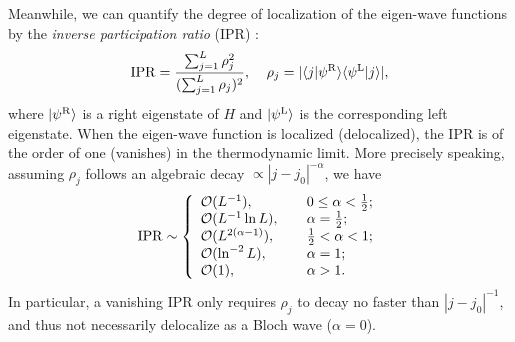 \documentclass{tADP2e}
\theoremstyle{plain}
\theoremstyle{plain}
\theoremstyle{definition}
\begin{document}
Meanwhile, we can quantify the degree of localization of the eigen-wave functions by the \emph{inverse participation ratio} (IPR) \cite{HN98}:
\begin{equation}
{\rm IPR}=\frac{\sum^L_{j=1} \rho_j^2}{(\sum^L_{j=1}\rho_j)^2},\;\;\;\;\rho_j=|\langle j|\psi^{\rm R}\rangle\langle\psi^{\rm L}| j\rangle|,
\end{equation} 
where $|\psi^{\rm R}\rangle$ is a right eigenstate of $H$ and $|\psi^{\rm L}\rangle$ is the corresponding left eigenstate. 
When the eigen-wave function is localized (delocalized), the IPR is of the order of one (vanishes) in the thermodynamic limit. More precisely speaking, assuming $\rho_j$ follows an algebraic decay $\propto|j-j_0|^{-\alpha}$, we have
\begin{equation}
{\rm IPR}\sim\left\{\begin{array}{ll} 
\mathcal{O}(L^{-1}), & \;\;\;\;0\le\alpha<\frac{1}{2}; \\  
\mathcal{O}(L^{-1}\ln L), & \;\;\;\;\alpha=\frac{1}{2}; \\ 
\mathcal{O}(L^{2(\alpha-1)}), & \;\;\;\;\frac{1}{2}<\alpha<1; \\ 
\mathcal{O}(\ln^{-2} L), & \;\;\;\;\alpha=1; \\ 
\mathcal{O}(1), & \;\;\;\;\alpha>1. 
\end{array}\right.
\label{IPRalpha}
\end{equation}
In particular, a vanishing IPR only requires $\rho_j$ to decay no faster than $|j-j_0|^{-1}$, and thus not necessarily delocalize as a Bloch wave ($\alpha=0$).
\end{document}

